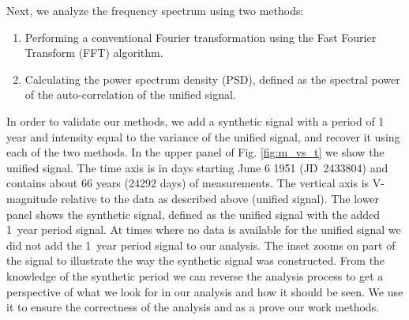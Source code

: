 \documentclass[twocolumn]{aastex62}
\begin{document}
Next, we analyze the frequency spectrum using two methods:
\begin{enumerate}
\item Performing a conventional Fourier transformation using the Fast Fourier Transform (FFT) algorithm.
\item Calculating the power spectrum density (PSD), defined as the spectral power of the auto-correlation of the unified signal.
\end{enumerate}
In order to validate our methods, we add a synthetic signal with a period of 1 year and intensity equal to the variance of the unified signal, and recover it using each of the two methods.
In the upper panel of Fig. \ref{fig:m_vs_t} we show the unified signal.
The time axis is in days starting June 6 1951 (JD~2433804) and contains about 66 years (24292 days) of measurements.
The vertical axis is V-magnitude relative to the data as described above (unified signal).
The lower panel shows the synthetic signal, defined as the unified signal with the added 1~year period signal.
At times where no data is available for the unified signal we did not add the 1~year period signal to our analysis.
The inset zooms on part of the signal to illustrate the way the synthetic signal was constructed.
From the knowledge of the synthetic period we can reverse the analysis process to get a perspective of what we look for in our analysis and how it should be seen.
We use it to ensure the correctness of the analysis and as a prove our work methods.
%
\end{document}
